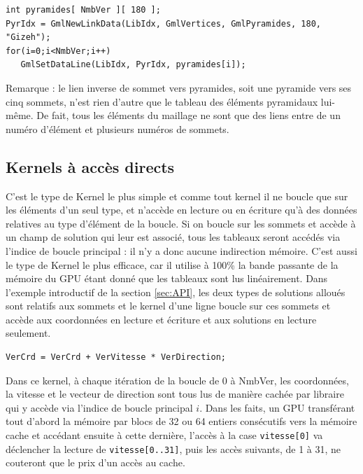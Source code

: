 \documentclass[a4paper,12pt]{article}
\begin{document}
\begin{tt}
\begin{verbatim}
int pyramides[ NmbVer ][ 180 ];
PyrIdx = GmlNewLinkData(LibIdx, GmlVertices, GmlPyramides, 180, "Gizeh");
for(i=0;i<NmbVer;i++)
   GmlSetDataLine(LibIdx, PyrIdx, pyramides[i]);
\end{verbatim}
\end{tt}
\normalfont

Remarque : le lien inverse de sommet vers pyramides, soit une pyramide vers ses cinq sommets, n'est rien d'autre que le tableau des éléments pyramidaux lui-même.
De fait, tous les éléments du maillage ne sont que des liens entre de un numéro d'élément et plusieurs numéros de sommets.

\subsection{Kernels à accès directs}
\label{sec:kernels_directs}
C'est le type de Kernel le plus simple et comme tout kernel il ne boucle que sur les éléments d'un seul type, et n'accède en lecture ou en écriture qu'à des données relatives au type d'élément de la boucle.
Si on boucle sur les sommets et accède à un champ de solution qui leur est associé, tous les tableaux seront accédés via l'indice de boucle principal : il n'y a donc aucune indirection mémoire.
C'est aussi le type de Kernel le plus efficace, car il utilise à 100\% la bande passante de la mémoire du GPU étant donné que les tableaux sont lus linéairement.
Dans l'exemple introductif de la section \ref{sec:API}, les deux types de solutions alloués sont relatifs aux sommets et le kernel d'une ligne boucle sur ces sommets et accède aux coordonnées en lecture et écriture et aux solutions en lecture seulement.

\begin{tt}
\begin{verbatim}
VerCrd = VerCrd + VerVitesse * VerDirection;
\end{verbatim}
\end{tt}
\normalfont

Dans ce kernel, à chaque itération de la boucle de 0 à NmbVer, les coordonnées, la vitesse et le vecteur de direction sont tous lus de manière cachée par libraire qui y accède via l'indice de boucle principal $i$.
Dans les faits, un GPU transférant tout d'abord la mémoire par blocs de 32 ou 64 entiers consécutifs vers la mémoire cache et accédant ensuite à cette dernière, l'accès à la case {\tt vitesse[0]} va déclencher la lecture de {\tt vitesse[0..31]}, puis les accès suivants, de 1 à 31, ne couteront que le prix d'un accès au cache.
\end{document}
